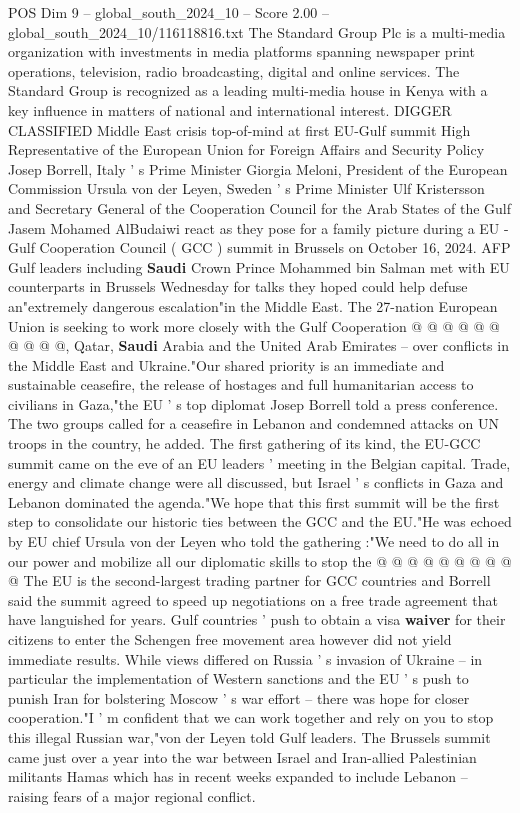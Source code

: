 \begin{textsample}{POS Dim 9 – global\_south\_2024\_10 – Score 2.00 – global\_south\_2024\_10/116118816.txt}  \label{ex:f9_pos_166}
The Standard Group Plc is a multi-media organization with investments in media platforms spanning newspaper print operations, television, radio broadcasting, digital and online services.
The Standard Group is recognized as a leading multi-media house in Kenya with a key influence in matters of national and international interest.
DIGGER CLASSIFIED Middle East crisis top-of-mind at first EU-Gulf summit High Representative of the European Union for Foreign Affairs and Security Policy Josep Borrell, Italy ' s Prime Minister Giorgia Meloni, President of the European Commission Ursula von der Leyen, Sweden ' s Prime Minister Ulf Kristersson and Secretary General of the Cooperation Council for the Arab States of the Gulf Jasem Mohamed AlBudaiwi react as they pose for a family picture during a EU - Gulf Cooperation Council ( GCC ) summit in Brussels on October 16, 2024.
AFP Gulf leaders including \textbf{Saudi} Crown Prince Mohammed bin Salman met with EU counterparts in Brussels Wednesday for talks they hoped could help defuse an"extremely dangerous escalation"in the Middle East.
The 27-nation European Union is seeking to work more closely with the Gulf Cooperation @ @ @ @ @ @ @ @ @ @, Qatar, \textbf{Saudi} Arabia and the United Arab Emirates -- over conflicts in the Middle East and Ukraine."Our shared priority is an immediate and sustainable ceasefire, the release of hostages and full humanitarian access to civilians in Gaza,"the EU ' s top diplomat Josep Borrell told a press conference.
The two groups called for a ceasefire in Lebanon and condemned attacks on UN troops in the country, he added.
The first gathering of its kind, the EU-GCC summit came on the eve of an EU leaders ' meeting in the Belgian capital.
Trade, energy and climate change were all discussed, but Israel ' s conflicts in Gaza and Lebanon dominated the agenda."We hope that this first summit will be the first step to consolidate our historic ties between the GCC and the EU."He was echoed by EU chief Ursula von der Leyen who told the gathering :"We need to do all in our power and mobilize all our diplomatic skills to stop the @ @ @ @ @ @ @ @ @ @ The EU is the second-largest trading partner for GCC countries and Borrell said the summit agreed to speed up negotiations on a free trade agreement that have languished for years.
Gulf countries ' push to obtain a visa \textbf{waiver} for their citizens to enter the Schengen free movement area however did not yield immediate results.
While views differed on Russia ' s invasion of Ukraine -- in particular the implementation of Western sanctions and the EU ' s push to punish Iran for bolstering Moscow ' s war effort -- there was hope for closer cooperation."I ' m confident that we can work together and rely on you to stop this illegal Russian war,"von der Leyen told Gulf leaders.
The Brussels summit came just over a year into the war between Israel and Iran-allied Palestinian militants Hamas which has in recent weeks expanded to include Lebanon -- raising fears of a major regional conflict.

\end{textsample}
